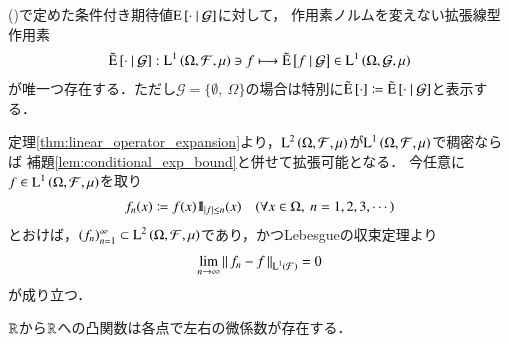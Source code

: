 	\begin{screen}
		\begin{thm}[条件付き期待値の拡張]
			()で定めた条件付き期待値$\operatorname{E} \left[ \cdot \ \middle|\ \mathcal{G} \right]$に対して，
			作用素ノルムを変えない拡張線型作用素
			\begin{align}
				\tilde{\operatorname{E}} \left[ \cdot \ \middle|\ \mathcal{G} \right]:\operatorname{L}^{1} \left(\Omega,\mathcal{F},\mu\right) \ni f \longmapsto \tilde{\operatorname{E}} \left[ f \ \middle|\ \mathcal{G} \right] \in \operatorname{L}^{1} \left(\Omega,\mathcal{G},\mu\right)
			\end{align}
			が唯一つ存在する．ただし$\mathcal{G} = \{\emptyset,\ \Omega\}$の場合は特別に$\tilde{\operatorname{E}} \left[ \cdot \right] \coloneqq \tilde{\operatorname{E}} \left[ \cdot \ \middle|\ \mathcal{G} \right]$と表示する．
			\label{thm:conditional_exp_expansion}
		\end{thm}
	\end{screen}
	
	\begin{prf}	
		定理\ref{thm:linear_operator_expansion}より，$\operatorname{L}^{2} \left(\Omega,\mathcal{F},\mu\right)$が$\operatorname{L}^{1} \left(\Omega,\mathcal{F},\mu\right)$で稠密ならば
		補題\ref{lem:conditional_exp_bound}と併せて拡張可能となる．
		今任意に$f \in \operatorname{L}^{1} \left(\Omega,\mathcal{F},\mu\right)$を取り
		\begin{align}
			f_n(x) \coloneqq f(x) \mbox{1}\hspace{-0.25em}\mbox{l}_{|f| \leq n} (x) \quad (\forall x \in \Omega,\ n=1,2,3,\cdots) \label{conditional_exp_expansion}
		\end{align}
		とおけば，$(f_n)_{n=1}^{\infty} \subset \operatorname{L}^{2} \left(\Omega,\mathcal{F},\mu\right)$であり，かつLebesgueの収束定理より
		\begin{align}
			\lim_{n \to \infty} \left\|\, f_n - f\, \right\|_{\operatorname{L}^{1} \left(\mathcal{F}\right)} = 0
		\end{align}
		が成り立つ．
		\QED
	\end{prf}
	
	\begin{screen}
		\begin{lem}[凸関数は片側微分可能]
			$\mathbb{R}$から$\mathbb{R}$への凸関数は各点で左右の微係数が存在する．
			\label{lem:convex_function_measurability}
		\end{lem}
	\end{screen}
	
